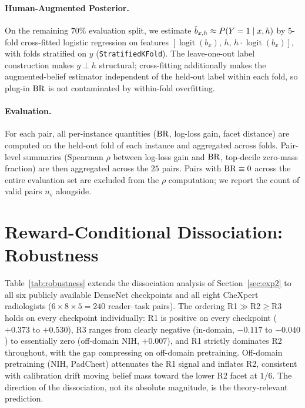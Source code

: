 \paragraph{Human-Augmented Posterior.}
On the remaining $70\%$ evaluation split, we estimate $\hat{b}_{x,h} \approx P(Y=1\mid x,h)$ by $5$-fold cross-fitted logistic regression on features $[\operatorname{logit}(b_x),\,h,\,h\cdot\operatorname{logit}(b_x)]$, with folds stratified on $y$ (\texttt{StratifiedKFold}).
The leave-one-out label construction makes $y \perp h$ structural; cross-fitting additionally makes the augmented-belief estimator independent of the held-out label within each fold, so plug-in $\operatorname{BR}$ is not contaminated by within-fold overfitting.

\paragraph{Evaluation.}
For each pair, all per-instance quantities ($\operatorname{BR}$, log-loss gain, facet distance) are computed on the held-out fold of each instance and aggregated across folds.
Pair-level summaries (Spearman $\rho$ between log-loss gain and $\operatorname{BR}$, top-decile zero-mass fraction) are then aggregated across the $25$ pairs.
Pairs with $\operatorname{BR}\equiv 0$ across the entire evaluation set are excluded from the $\rho$ computation; we report the count of valid pairs $n_{\mathrm{v}}$ alongside.

\section{Reward-Conditional Dissociation: Robustness}
\label{app:exp2-robustness}

Table~\ref{tab:robustness} extends the dissociation analysis of Section~\ref{sec:exp2} to all six publicly available DenseNet checkpoints and all eight CheXpert radiologists ($6 \times 8 \times 5 = 240$ reader--task pairs).
The ordering R1${\gg}$R2${\geq}$R3 holds on every checkpoint individually: R1 is positive on every checkpoint ($+0.373$ to $+0.530$), R3 ranges from clearly negative (in-domain, $-0.117$ to $-0.040$) to essentially zero (off-domain NIH, $+0.007$), and R1 strictly dominates R2 throughout, with the gap compressing on off-domain pretraining.
Off-domain pretraining (NIH, PadChest) attenuates the R1 signal and inflates R2, consistent with calibration drift moving belief mass toward the lower R2 facet at $1/6$.
The direction of the dissociation, not its absolute magnitude, is the theory-relevant prediction.

